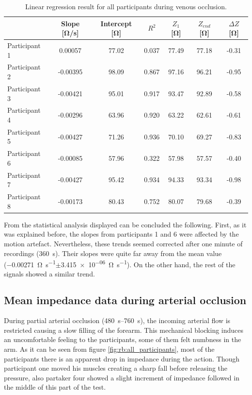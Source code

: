 \begin{table}[htbp]
	\caption{Linear regression result for all participants during venous occlusion.}
	\label{tbl:venous_occlusion:region2}
	\centering
	\begin{tabu}{lcccccc}
		\toprule
		& \textbf{Slope [\si{\ohm/\second}]} & \textbf{Intercept [\si{\ohm}]} & \textbf{$R^2$} & \textbf{$Z_1$ [\si{\ohm}]} & \textbf{$Z_{end}$ [\si{\ohm}]} & \textbf{ $\Delta Z$ [\si{\ohm}]} \\ \midrule
		Participant 1  &   0.00057  &  77.02   &     0.037  &  77.49  &  77.18  &  -0.31\\
		Participant 2  &  -0.00395  &  98.09   &     0.867  &  97.16  &  96.21  &  -0.95\\
		Participant 3  &  -0.00421  &  95.01   &     0.917  &  93.47  &  92.89  &  -0.58\\
		Participant 4  &  -0.00296  &  63.96   &     0.920  &  63.22  &  62.61  &  -0.61\\
		Participant 5  &  -0.00427  &  71.26   &     0.936  &  70.10  &  69.27  &  -0.83\\
		Participant 6  &  -0.00085  &  57.96   &     0.322  &  57.98  &  57.57  &  -0.40\\
		Participant 7  &  -0.00427  &  95.42   &     0.934  &  94.33  &  93.34  &  -0.98\\
		Participant 8  &  -0.00173  &  80.43   &     0.752  &  80.07  &  79.68  &  -0.39\\ \bottomrule
	\end{tabu} 
\end{table}

From the statistical analysis displayed can be concluded the following. First, as it was explained before, the slopes from participants 1 and 6 were affected by the motion artefact. Nevertheless, these trends seemed corrected after one minute of recordings (\SI{360}{\second}). Their slopes were quite far away from the mean value (\SI{-0.00271}{\ohm\per\second}$\pm$\SI{3.415e-06}{\ohm\per\second}). On the other hand, the rest of the signals showed a similar trend. 


\subsection{Mean impedance data during arterial occlusion}
\label{section5.2.3}
During partial arterial occlusion (\SIrange{480}{760}{\second}), the incoming arterial flow is restricted causing a slow filling of the forearm. This mechanical blocking induces an uncomfortable feeling to the participants, some of them felt numbness in the arm.  As it can be seen from figure \ref{fig:rb:all_participants}, most of the participants there is an apparent drop in impedance during the action. Though participant one moved his muscles creating a sharp fall before releasing the pressure, also partaker four showed a slight increment of impedance followed in the middle of this part of the test. 


